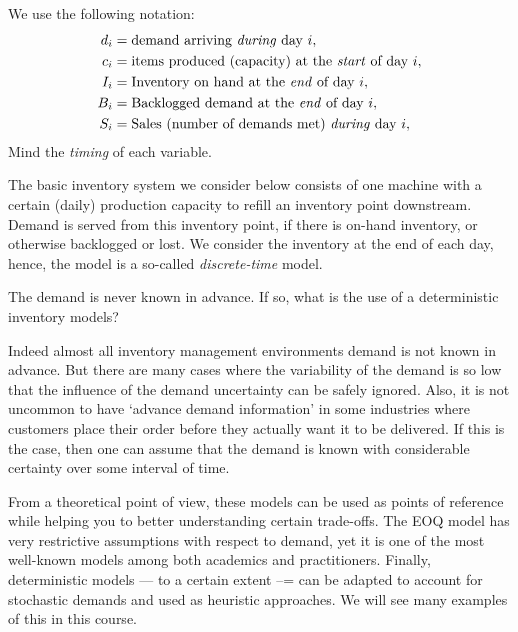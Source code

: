 We use the following notation:
\begin{align*}
  d_i &= \text{demand arriving \emph{during} day $i$}, \\
  c_i &= \text{items produced (capacity) at the \emph{start} of day $i$}, \\
  I_i &= \text{Inventory on hand at the \emph{end} of day $i$}, \\
  B_i &= \text{Backlogged demand at the \emph{end} of day $i$}, \\
  S_i &= \text{Sales (number of demands met) \emph{during}  day $i$}, \\
\end{align*}
Mind the \emph{timing} of each variable.

The basic inventory system we consider below consists of one machine with a certain (daily) production capacity to refill an inventory point downstream. Demand is served from this inventory point, if there is on-hand inventory, or otherwise backlogged or lost. We consider the inventory at the end of each day, hence, the model is a so-called \emph{discrete-time} model.

\begin{exercise}
The demand is never known in advance. If so, what is the use of a deterministic inventory models?


\begin{solution}
Indeed almost all inventory management environments demand is not known in advance. But there are many cases where the variability of the demand is so low that the influence of the demand uncertainty can be safely ignored. Also, it is not uncommon to have `advance demand information' in some industries where customers place their order before they actually want it to be delivered. If this is the case, then one can  assume that the demand is known with considerable certainty over some interval of time. 

From a theoretical point of view, these models can be used as points of reference while helping you to better understanding certain trade-offs. The EOQ model has very restrictive assumptions with respect to demand, yet it is one of the most well-known models among both academics and practitioners. Finally, deterministic models --- to a certain extent --= can be adapted to account for stochastic demands and used as heuristic approaches. We will see many examples of this in this course.  
\end{solution}
\end{exercise}

